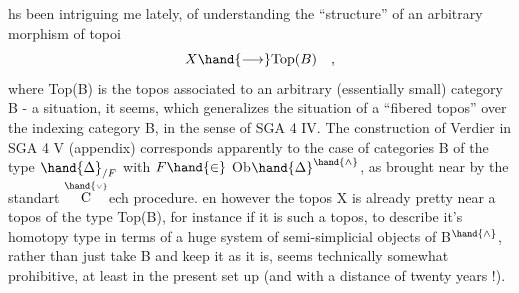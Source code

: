hs been intriguing me lately,  of understanding the ``structure'' of an
arbitrary morphism of topoi
\[ X \hand{\longrightarrow} \mathrm{Top}(B) \quad , \]
where Top(B) is the topos associated to an arbitrary (essentially small)
category B  -  a situation,  it seems,  which generalizes the situation
of a ``fibered topos'' over the indexing category B,  in the sense of
SGA 4 IV.  The construction of Verdier in SGA 4 V (appendix) corresponds
apparently to the case of categories B of the type $\hand{\Delta}_{/F}$  with $F \hand{\in}$ Ob$\hand{\Delta}^{\hand{\wedge}}$,
as brought near by the standart $\overset{\hand{\scriptscriptstyle\vee}}{\mathrm{C}}$ech procedure.  en however the topos X
is already pretty near a topos of the type Top(B),  for instance if it is
such a topos,  to describe it's homotopy type in terms of a huge  system
of semi-simplicial objects of B$^{\hand{\wedge}}$,  rather than just take B and keep it as
it is,  seems technically somewhat prohibitive,  at least in the present
set up (and with a distance of twenty years !).

